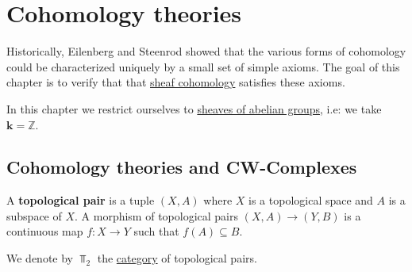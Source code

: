 \documentclass[../../main]{subfiles}
\begin{document}
\chapter{Cohomology theories}\label{ch:cohomology-theories}


Historically, Eilenberg and Steenrod showed that the various forms of cohomology could be characterized uniquely by a small set of simple axioms.
The goal of this chapter is to verify that that \hyperref[def:sheaf-cohomology]{sheaf cohomology} satisfies these axioms.

In this chapter we restrict ourselves to \hyperref[def:sheaf]{sheaves of abelian groups}, i.e: we take \(\mathbf{k} = \mathbb{Z}\).

\section{Cohomology theories and CW-Complexes}

\begin{definition}\label{def:topological-pair}
  A \textbf{topological pair} is a tuple \((X, A)\) where \(X\) is a topological space and \(A\) is a subspace of \(X\).
  A morphism of topological pairs \((X, A) \to (Y, B)\) is a continuous map \(f\colon X \to Y\) such that \(f(A) \subseteq B\).
  
  We denote by \(\Top_{2}\) the \hyperref[def:category]{category} of topological pairs.
\end{definition}
\end{document}
